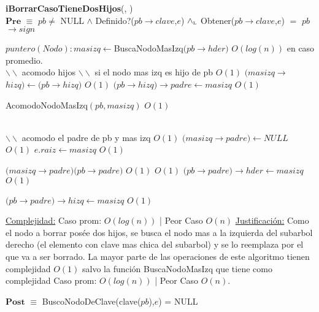 \begin{algorithm}[H]{\textbf{iBorrarCasoTieneDosHijos}(, )}
	{\\ $\textbf{Pre}$ $\equiv$ $pb \neq$ NULL $\land$ Definido?($pb$$\rightarrow$$clave$,$e$) $\land_{\mathrm{\scriptscriptstyle{L}}}$ Obtener($pb$$\rightarrow$$clave$,$e$) $=$ $pb$$\rightarrow$$sign$}
	\begin{algorithmic}[1]

		\State $puntero(Nodo): masizq \gets $BuscaNodoMasIzq$(pb$$\rightarrow$$hder)$ \Comment $O(log(n))$ en caso promedio.
		\\

		\State $\backslash\backslash$ acomodo hijos
		\State $\backslash\backslash$ si el nodo mas izq es hijo de pb
		 \Comment $O(1)$
			\State $(masizq$$\rightarrow$$hizq) \gets (pb$$\rightarrow$$hizq)$ \Comment $O(1)$
			\State $(pb$$\rightarrow$$hizq)$$\rightarrow$$padre \gets masizq$ \Comment $O(1)$

		\Else

			\State AcomodoNodoMasIzq$(pb, masizq)$ \Comment $O(1)$

		\EndIf
		\\

		\State $\backslash\backslash$ acomodo el padre de pb y mas izq
		 \Comment $O(1)$
			\State $(masizq$$\rightarrow$$padre) \gets NULL$ \Comment $O(1)$
			\State $e.raiz \gets masizq$ \Comment $O(1)$
		
		\Else
			\State $(masizq$$\rightarrow$$padre) (pb$$\rightarrow$$padre)$ \Comment $O(1)$
			 \Comment $O(1)$
				\State $(pb$$\rightarrow$$padre)$$\rightarrow$$hder \gets masizq$ \Comment $O(1)$

			\Else
				\State $(pb$$\rightarrow$$padre)$$\rightarrow$$hizq \gets masizq$ \Comment $O(1)$

			\EndIf

		\EndIf


		\medskip
		\Statex \underline{Complejidad:} Caso prom: $O(log(n))$ | Peor Caso $O(n)$
		\Statex \underline{Justificación:} Como el nodo a borrar posée dos hijos, se busca el nodo mas a la izquierda del subarbol derecho (el elemento con clave mas chica del subarbol) y se lo reemplaza por el que va a ser borrado. La mayor parte de las operaciones de este algoritmo tienen complejidad $O(1)$ salvo la función BuscaNodoMasIzq que tiene como complejidad Caso prom: $O(log(n))$ | Peor Caso $O(n)$.

    \end{algorithmic}
    {$\textbf{Post}$ $\equiv$ BuscoNodoDeClave(clave($pb$),$e$) = NULL}
\end{algorithm}


